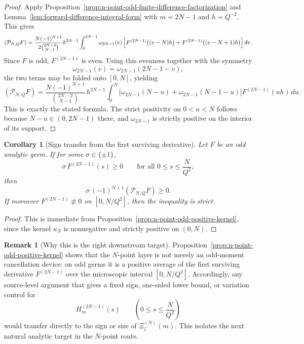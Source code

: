 \documentclass[11pt,a4paper]{amsart}
\theoremstyle{plain}
\newtheorem{corollary}[theorem]{Corollary}
\theoremstyle{definition}
\newtheorem{remark}[theorem]{Remark}
\begin{document}
\begin{proof}
Apply Proposition~\ref{prop:n-point-odd-finite-difference-factorization} and
Lemma~\ref{lem:forward-difference-integral-form} with $m=2N-1$ and
$h=Q^{-2}$. This gives
\[
(\mathcal P_{N,Q}F)
=
\frac{N(-1)^{N+1}}{2\binom{2N-2}{N-1}}
h^{2N-1}
\int_0^{2N-1}
\omega_{2N-1}(v)\,
\Bigl[
F^{(2N-1)}\bigl((v-N)h\bigr)
+
F^{(2N-1)}\bigl((v-N+1)h\bigr)
\Bigr]\,dv.
\]
Since $F$ is odd, $F^{(2N-1)}$ is even. Using this evenness together with
the symmetry
\[
\omega_{2N-1}(v)=\omega_{2N-1}(2N-1-v),
\]
the two terms may be folded onto $[0,N]$, yielding
\[
(\mathcal P_{N,Q}F)
=
\frac{N(-1)^{N+1}}{\binom{2N-2}{N-1}}\,
h^{2N-1}
\int_0^N
\bigl[
\omega_{2N-1}(N-u)+\omega_{2N-1}(N-1-u)
\bigr]
F^{(2N-1)}(uh)\,du.
\]
This is exactly the stated formula. The strict positivity on $0<u<N$
follows because $N-u\in(0,2N-1)$ there, and
$\omega_{2N-1}$ is strictly positive on the interior of its support.
\end{proof}

\begin{corollary}[Sign transfer from the first surviving derivative]
\label{cor:n-point-sign-transfer}
Let $F$ be an odd analytic germ. If for some $\sigma\in\{\pm1\}$,
\[
\sigma\,F^{(2N-1)}(s)\ge 0
\qquad
\text{for all } 0\le s\le \frac{N}{Q^2},
\]
then
\[
\sigma\,(-1)^{N+1}(\mathcal P_{N,Q}F)\ge 0.
\]
If moreover $F^{(2N-1)}\not\equiv 0$ on $[0,N/Q^2]$, then the inequality
is strict.
\end{corollary}

\begin{proof}
This is immediate from Proposition~\ref{prop:n-point-odd-positive-kernel},
since the kernel $\kappa_N$ is nonnegative and strictly positive on
$(0,N)$.
\end{proof}

\begin{remark}[Why this is the right downstream target]
\label{rem:n-point-positive-kernel-target}
Proposition~\ref{prop:n-point-odd-positive-kernel} shows that the $N$-point
layer is not merely an odd-moment cancellation device: on odd germs it is a
positive average of the first surviving derivative
$F^{(2N-1)}$ over the microscopic interval $[0,N/Q^2]$. Accordingly, any
source-level argument that gives a fixed sign, one-sided lower bound, or
variation control for
\[
H_m^{(2N-1)}(s)
\qquad
\left(0\le s\le \frac{N}{Q^2}\right)
\]
would transfer directly to the sign or size of $\Xi_\zeta^{(N)}(m)$.
This isolates the next natural analytic target in the $N$-point route.
\end{remark}
\end{document}
